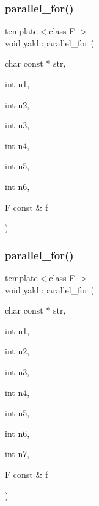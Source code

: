 \subsubsection{\texorpdfstring{parallel\+\_\+for()}{parallel\_for()}\hspace{0.1cm}{\footnotesize\ttfamily [14/16]}}
{\footnotesize\ttfamily template$<$class F $>$ \\
void yakl\+::parallel\+\_\+for (\begin{DoxyParamCaption}\item[{char const $\ast$}]{str,  }\item[{int}]{n1,  }\item[{int}]{n2,  }\item[{int}]{n3,  }\item[{int}]{n4,  }\item[{int}]{n5,  }\item[{int}]{n6,  }\item[{F const \&}]{f }\end{DoxyParamCaption})\hspace{0.3cm}{\ttfamily [inline]}}

\mbox{\label{namespaceyakl_af826c667f5b2fbb643adb2c410cc1ef1}} 
\subsubsection{\texorpdfstring{parallel\+\_\+for()}{parallel\_for()}\hspace{0.1cm}{\footnotesize\ttfamily [15/16]}}
{\footnotesize\ttfamily template$<$class F $>$ \\
void yakl\+::parallel\+\_\+for (\begin{DoxyParamCaption}\item[{char const $\ast$}]{str,  }\item[{int}]{n1,  }\item[{int}]{n2,  }\item[{int}]{n3,  }\item[{int}]{n4,  }\item[{int}]{n5,  }\item[{int}]{n6,  }\item[{int}]{n7,  }\item[{F const \&}]{f }\end{DoxyParamCaption})\hspace{0.3cm}{\ttfamily [inline]}}

